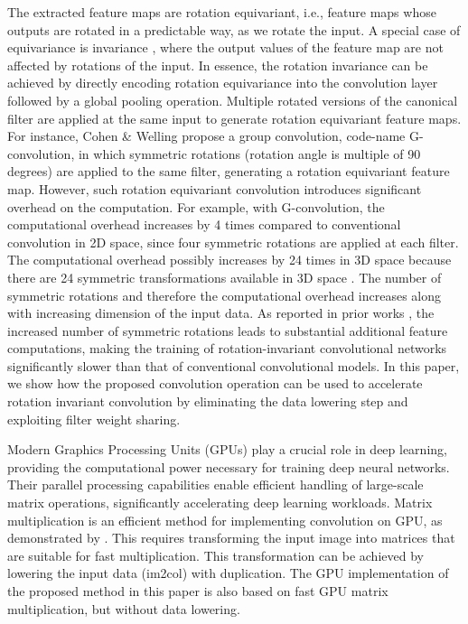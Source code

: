 The extracted feature maps are rotation equivariant, i.e., feature maps
whose outputs are rotated in a predictable way, as we rotate the input.
A special case of equivariance is invariance \cite{harmonic-cnn}, where the output
values of the feature map are not affected by rotations of the input. 
In essence, the rotation invariance can be achieved by directly encoding rotation equivariance into the convolution layer followed by a global pooling operation. Multiple rotated versions of the canonical filter are applied at the same input to generate rotation equivariant feature maps. For instance, Cohen \& Welling \cite{G} propose a group convolution, code-name G-convolution, in which symmetric rotations (rotation angle is multiple of 90 degrees) are applied to the same filter, generating a rotation equivariant feature map. However, such rotation equivariant convolution introduces significant overhead on the computation. For example, with G-convolution, the computational overhead increases by 4 times compared to conventional convolution in 2D space, since four symmetric rotations are applied at each filter. The computational overhead possibly increases by 24 times in 3D space because there are 24 symmetric transformations available in 3D space \cite{CubeNet1}. The number of symmetric rotations and therefore the computational overhead increases along with increasing dimension of the input data. As reported in prior works \cite{11125636, yang2025group}, the increased number of symmetric rotations leads to substantial additional feature computations, making the training of rotation-invariant convolutional networks significantly slower than that of conventional convolutional models.
In this paper, we show how the proposed convolution operation can be used to accelerate rotation invariant convolution by eliminating the data lowering step and exploiting filter weight sharing.


Modern Graphics Processing Units (GPUs) play a crucial role in deep learning, providing the computational power necessary for training deep neural networks. Their parallel processing capabilities enable efficient handling of large-scale matrix operations, significantly accelerating deep learning workloads.
Matrix multiplication is an efficient method for implementing convolution on GPU, as demonstrated by \cite{cuDNN}. 
This requires transforming the input image into matrices that are suitable for fast multiplication.
This transformation can be achieved by lowering the input data (im2col) with duplication.
The GPU implementation of the proposed method in this paper is also based on fast GPU matrix multiplication, but without data lowering. 

